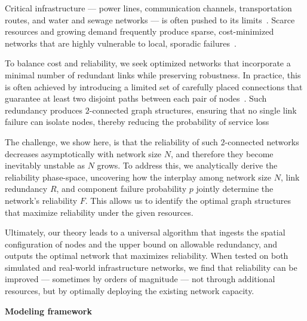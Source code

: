 \documentclass[oneside, a4paper, onecolumn, 11pt]{article}
\begin{document}
\begin{refsection}

Critical infrastructure — power lines, communication channels, transportation routes, and water and sewage networks — is often pushed to its limits~\supercite{PowerResilience,prudhvi2025vulnerability}. Scarce resources and growing demand frequently produce sparse, cost-minimized networks that are highly vulnerable to local, sporadic failures~\supercite{cohen2000resilience,motter2002cascade,universal_gao_2016,robustness_artime_2024,albert2000error}.

To balance cost and reliability, we seek optimized networks that incorporate a minimal number of redundant links while preserving robustness. In practice, this is often achieved by introducing a limited set of carefully placed connections that guarantee at least two disjoint paths between each pair of nodes~\supercite{JainRaviSingh03,TarjanConencted,kerivin2005design,Frederickson1981ApproximationAF,SeboeVygen14,monma1989methods}. Such redundancy produces $2$-connected graph structures, ensuring that no single link failure can isolate nodes, thereby reducing the probability of service loss~\supercite{moore1956reliable,Boesch1986OnUP,wang1997structure,On_the_validity,romero2021uniformly}

The challenge, we show here, is that the reliability of such $2$-connected networks decreases asymptotically with network size $N$, and therefore they become inevitably unstable as $N$ grows. To address this, we analytically derive the reliability phase-space, uncovering how the interplay among network size $N$, link redundancy $R$, and component failure probability $p$ jointly determine the network’s reliability $F$. This allows us to identify the optimal graph structures that maximize reliability under the given resources.

Ultimately, our theory leads to a universal algorithm that ingests the spatial~\supercite{spatial_barthelemy_2010,shape_gastner_2020,Shekhtman2014RobustnessOA,tomassini2025enhancing,catastrophic_buldyrev_2010,complex_vespignani_2010} configuration of nodes and the upper bound on allowable redundancy, and outputs the optimal network that maximizes reliability. When tested on both simulated and real-world infrastructure networks, we find that reliability can be improved — sometimes by orders of magnitude — not through additional resources, but by optimally deploying the existing network capacity.

\vspace{3mm}
\textbf{\Large \color{blue} Modeling framework}


\end{refsection}
\end{document}
